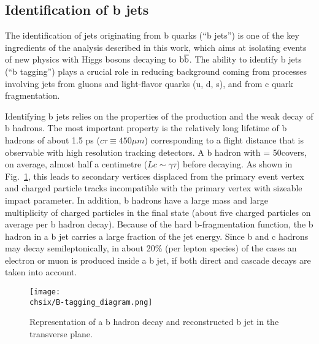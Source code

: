 \subsection{Identification of b jets}\label{subsec:bjets}

The identification of jets originating from b quarks (``b jets'') is one of the key ingredients of the analysis described in this work, which aims at isolating events of new physics with Higgs bosons decaying to ${\mathrm{b}\overline{\mathrm{b}}}$. The ability to identify b jets (``b tagging'') plays a crucial role in reducing background coming from processes involving jets from gluons and light-flavor quarks (u, d, s), and from c quark fragmentation.

Identifying b jets relies on the properties of the production and the weak decay of b hadrons. The most important property is the relatively long lifetime of b hadrons of about 1.5 ps ($c\tau \equiv 450\mu m$) corresponding to a flight distance that is observable with high resolution tracking detectors. A b hadron with \pt = 50\GeV covers, on average, almost half a centimetre ($Lc \sim \gamma\tau$) before decaying. As shown in Fig.~\ref{fig:bjet}, this leads to secondary vertices displaced from the primary event vertex and charged particle tracks incompatible with the primary vertex with sizeable impact parameter. In addition, b hadrons have a large mass and large multiplicity of charged particles in the final state (about five charged particles on average per b hadron decay). Because of the hard b-fragmentation function, the b hadron in a b jet carries a large fraction of the jet energy. Since b and c hadrons may decay semileptonically, in about 20\% (per lepton species) of the cases an electron or muon is produced inside a b jet, if both direct and cascade decays are taken into account.

\begin{figure}[!htb]
 \begin{center}
  \texttt{[image: \\chsix/B-tagging\_diagram.png]}
 \end{center}
 \caption{Representation of a b hadron decay and reconstructed b jet in the transverse plane.}
 \label{fig:bjet}
\end{figure}

